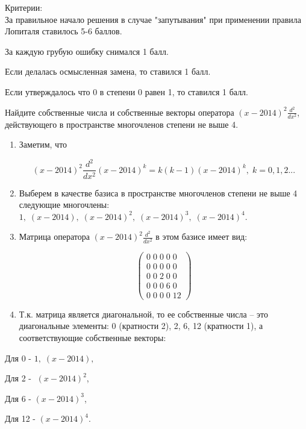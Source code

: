 \documentclass[addpoints, answers]{exam} %
\begin{document}
\begin{questions}
\begin{solution}
Критерии:\\
За правильное начало решения в случае "запутывания" при применении правила Лопиталя ставилось 5-6 баллов.

За каждую грубую ошибку снимался 1 балл.

Если делалась осмысленная замена, то ставился 1 балл.

Если утверждалось что 0 в степени 0 равен 1, то ставился 1 балл.
\end{solution}

\question[10] Найдите собственные числа и собственные векторы оператора $(x-2014)^{2} \frac{d^{2} }{dx^{2} } $, действующего в пространстве многочленов степени не выше 4.



\begin{solution}

\begin{enumerate}
\item Заметим, что 

\[(x-2014)^{2} \frac{d^{2} }{dx^{2} } (x-2014)^{k} =k(k-1)(x-2014)^{k} ,\; k=0,1,2...\] 

\item  Выберем в качестве базиса в пространстве многочленов степени не выше 4 следующие многочлены: $1,\; (x-2014),\; (x-2014)^{2} ,\; (x-2014)^{3} ,\; (x-2014)^{4} $.

\item  Матрица оператора $(x-2014)^{2} \frac{d^{2} }{dx^{2} } $ в этом базисе имеет вид:

\[\left(\begin{array}{l} {0\; 0\; 0\; 0\; 0} \\ {0\; 0\; 0\; 0\; 0} \\ {0\; 0\; 2\; 0\; 0} \\ {0\; 0\; 0\; 6\; 0} \\ {0\; 0\; 0\; 0\; 12} \end{array}\right)\] 

\item  Т.к. матрица является диагональной, то ее собственные числа -- это диагональные элементы: 0 (кратности 2), 2, 6, 12 (кратности 1), а соответствующие собственные векторы:
\end{enumerate}

Для 0 - $1,\; (x-2014),\; $

Для 2 - $\; (x-2014)^{2} $,

Для 6 - $(x-2014)^{3} $,

Для 12 - $(x-2014)^{4} $.


\end{solution}
\end{questions}
\end{document}
